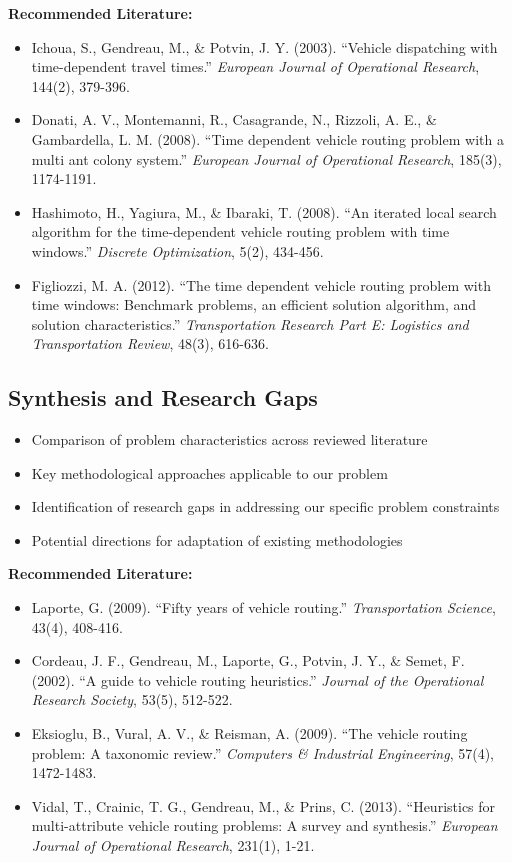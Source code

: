 \noindent\textbf{Recommended Literature:}
\begin{itemize}
    \item Ichoua, S., Gendreau, M., \& Potvin, J. Y. (2003). ``Vehicle dispatching with time-dependent travel times.'' \textit{European Journal of Operational Research}, 144(2), 379-396.
    \item Donati, A. V., Montemanni, R., Casagrande, N., Rizzoli, A. E., \& Gambardella, L. M. (2008). ``Time dependent vehicle routing problem with a multi ant colony system.'' \textit{European Journal of Operational Research}, 185(3), 1174-1191.
    \item Hashimoto, H., Yagiura, M., \& Ibaraki, T. (2008). ``An iterated local search algorithm for the time-dependent vehicle routing problem with time windows.'' \textit{Discrete Optimization}, 5(2), 434-456.
    \item Figliozzi, M. A. (2012). ``The time dependent vehicle routing problem with time windows: Benchmark problems, an efficient solution algorithm, and solution characteristics.'' \textit{Transportation Research Part E: Logistics and Transportation Review}, 48(3), 616-636.
\end{itemize}

\subsection{Synthesis and Research Gaps}
\begin{itemize}
    \item Comparison of problem characteristics across reviewed literature
    \item Key methodological approaches applicable to our problem
    \item Identification of research gaps in addressing our specific problem constraints
    \item Potential directions for adaptation of existing methodologies
\end{itemize}

\noindent\textbf{Recommended Literature:}
\begin{itemize}
    \item Laporte, G. (2009). ``Fifty years of vehicle routing.'' \textit{Transportation Science}, 43(4), 408-416.
    \item Cordeau, J. F., Gendreau, M., Laporte, G., Potvin, J. Y., \& Semet, F. (2002). ``A guide to vehicle routing heuristics.'' \textit{Journal of the Operational Research Society}, 53(5), 512-522.
    \item Eksioglu, B., Vural, A. V., \& Reisman, A. (2009). ``The vehicle routing problem: A taxonomic review.'' \textit{Computers \& Industrial Engineering}, 57(4), 1472-1483.
    \item Vidal, T., Crainic, T. G., Gendreau, M., \& Prins, C. (2013). ``Heuristics for multi-attribute vehicle routing problems: A survey and synthesis.'' \textit{European Journal of Operational Research}, 231(1), 1-21.
\end{itemize}

